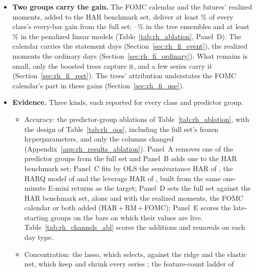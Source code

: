 \begin{itemize}
\item \textbf{Two groups carry the gain.} The FOMC calendar and the futures' realized moments, added to the HAR
  benchmark set, deliver at least \rhabBaseShareMin\% of every class's every-bar gain from the full set:
  \rhabBaseShareTreeMin--\rhabBaseShareTreeMax\% in the tree ensembles and at least \rhabBaseShareLinMin\% in the
  penalized linear models (Table~\ref{tab:rh_ablation}, Panel~D). The calendar carries the statement days
  (Section~\ref{sec:rh_fi_event}), the realized moments the ordinary days (Section~\ref{sec:rh_fi_ordinary}). What
  remains is small, only the boosted trees capture it, and a few series carry it (Section~\ref{sec:rh_fi_rest}). The
  trees' attribution understates the FOMC calendar's part in these gains (Section~\ref{sec:rh_fi_use}).
\item \textbf{Evidence.} Three kinds, each reported for every class and predictor group.
  \begin{itemize}
  \item Accuracy: the predictor-group ablations of Table~\ref{tab:rh_ablation}, with the design of
    Table~\ref{tab:rh_oos}, including the full set's frozen hyperparameters, and only the columns changed
    (Appendix~\ref{app:rh_results_ablation}). Panel~A removes one of the \rhfiNBuckets{} predictor groups from the full
    set and Panel~B adds one to the HAR benchmark set; Panel~C fits by OLS the semivariance HAR of
    \citet{PattonSheppard2015}, the HARQ model of \citet{BollerslevPattonQuaedvlieg2016} and the leverage HAR of
    \citet{CorsiReno2012}, built from the same one-minute E-mini returns as the target; Panel~D sets the full set
    against the HAR benchmark set, alone and with the realized moments, the FOMC calendar or both added
    (HAR\,+\,RM\,+\,FOMC); Panel~E scores the late-starting groups on the bars on which their values are live.
    Table~\ref{tab:rh_channels_abl} scores the additions and removals on each day type.
  \item Concentration: the lasso, which selects, against the ridge and the elastic net, which keep and shrink every
    series \citep[see][]{GiannoneLenzaPrimiceri2021}; the feature-count ladder of

\end{itemize}
\end{itemize}
